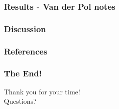 \documentclass[11pt,aspectratio=169]{beamer}
\begin{document}
    \begin{frame}
        \frametitle{Results - Van der Pol notes}

    \end{frame}

    \begin{frame}
        \frametitle{Discussion}

    \end{frame}


    \begin{frame}
        \frametitle{References}
        
        {\footnotesize }
    \end{frame}

    \begin{frame}
        \frametitle{The End!}
        \begin{center}
            \LARGE{Thank you for your time!} \\
            \LARGE{Questions?}
        \end{center}
    \end{frame}
\end{document}
